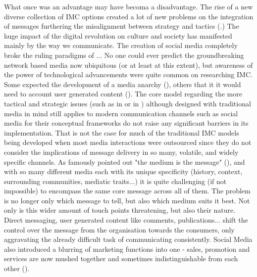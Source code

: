 \documentclass[11pt]{article}
\begin{document}
 What once was an advantage may have becoma a disadvantage. The rise of a new diverse collection of IMC options created a lot of new problems on the integration of messages furthering the misalignment between strategy and tactics (\cite{holm}.) The huge impact of the digital revolution on culture and society has manifested mainly by the way we communicate. The creation of social media completely broke the ruling paradigms of ... No one could ever predict the groundbreaking network based media now ubiquitous (or at least at this extent), but awareness of the power of technological advancements were quite common on researching IMC. Some expected the development of a media anarchy (\cite{solomon}), others that it it would need to account user generated content (\cite{ananda}). The core model regarding the more tactical and strategic issues (such as \citeauthor{schultz} in \citeyear{schultz} or \citeauthor{duncan} in \citeyear{duncan}) although designed with traditional media in mind still applies to modern communication channels such as social media for their conceptual frameworks do not raise any significant barriers in its implementation. That is not the case for much of the traditional IMC models being developed when most media interactions were outsourced since they do not consider the implications of message delivery in so many, volatile, and widely specific channels. As \citeauthor{mcluhan} famously pointed out "the medium is the message" (\citeyear{mcluhan}), and with so many different media each with its unique specificity (history, context, surrounding communities, mediatic traits...) it is quite challenging (if not impossible) to encompass the same core message across all of them. The problem is no longer only which message to tell, but also which medium suits it best. Not only is this wider amount of touch points threatening, but also their nature. Direct messaging, user generated content like comments, publications... shift the control over the message from the organisation towards the consumers, only aggravating the already difficult task of communicating consistently. Social Media also introduced a blurring of marketing functions into one - sales, promotion and services are now mushed together and sometimes indistinguishable from each other (\cite{valos}).  
 
\end{document}
